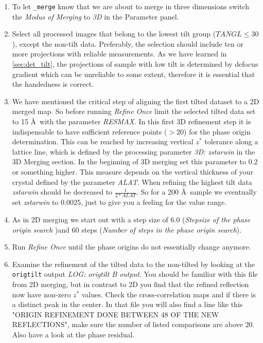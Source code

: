 \begin{enumerate}
	\item To let {\twodx}\texttt{\_merge} know that we are about to merge in three dimensions switch the \textit{Modus of Merging} to \textit{3D} in the Parameter panel.
	\item Select all processed images that belong to the lowest tilt group ($TANGL \leq 30$), except the non-tilt data. Preferably, the selection should include ten or more projections with reliable measurements. As we have learned in \autoref{sec:det_tilt}, the projections of sample with low tilt is determined by defocus gradient which can be unreliable to some extent, therefore it is essential that the handedness is correct.
	\item We have mentioned the critical step of aligning the first tilted dataset to a 2D merged map. So before running \textit{Refine Once} limit the selected tilted data set to 15 \AA~with the parameter \textit{RESMAX}. In this first 3D refinement step it is indispensable to have sufficient reference points ($>20$) for the phase origin determination. This can be reached by increasing vertical $z^*$ tolerance along a lattice line, which is defined by the processing parameter \textit{3D: zstarwin} in the 3D Merging section. In the beginning of 3D merging set this parameter to 0.2 or something higher. This measure depends on the vertical thickness of your crystal defined by the parameter \textit{ALAT}. When refining the highest tilt data  \textit{zstarwin} should be decreased to $\frac{1}{2*ALAT}$. So for a 200 \AA~sample we eventually set \textit{zstarwin} to 0.0025, just to give you a feeling for the value range. 
	\item As in 2D merging we start out with a step size of 6.0 (\textit{Stepsize of the phase origin search} )and 60 steps (\textit{Number of steps in the phase origin search}).
	\item \label{sec:refine_once_3d} Run \textit{Refine Once} until the phase origins do not essentially change anymore.
	\item Examine the refinement of the tilted data to the non-tilted by looking at the \texttt{origtilt} output \textit{LOG: origtilt B output}. You should be familiar with this file from 2D merging, but in contrast to 2D you find that the refined reflection now have non-zero $z^*$ values. Check the cross-correlation maps and if there is a distinct peak in the center. In that file you will also find a line like this "ORIGIN REFINEMENT DONE BETWEEN 48 OF THE NEW REFLECTIONS", make sure the number of listed comparisons are above 20. Also have a look at the phase residual.

\end{enumerate}
